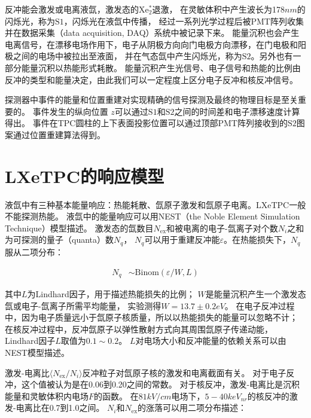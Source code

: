 反冲能会激发或电离液氙，激发态的$\mathrm{Xe_2^*}$退激，
在灵敏体积中产生波长为178$\si{nm}$的闪烁光，称为$\mathrm{S1}$，闪烁光在液氙中传播，
经过一系列光学过程后被PMT阵列收集并在数据采集（data acquisition, DAQ）系统中被记录下来。
能量沉积也会产生电离信号，在漂移电场作用下，电子从阴极方向向门电极方向漂移，在门电极和阳极之间的电场中被拉出至液面，
并在气态氙中产生闪烁光，称为$\mathrm{S2}$。另外也有一部分能量沉积以热能形式耗散。
能量沉积产生光信号、电子信号和热能的比例由反冲的类型和能量决定，由此我们可以一定程度上区分电子反冲和核反冲信号。

探测器中事件的能量和位置重建对实现精确的信号探测及最终的物理目标是至关重要的。
事件发生的纵向位置 $z$可以通过$\mathrm{S1}$和$\mathrm{S2}$之间的时间差和电子漂移速度计算得出。
事件在TPC圆柱的上下表面投影位置可以通过顶部PMT阵列接收到的$\mathrm{S2}$图案通过位置重建算法得到。

\section{LXeTPC的响应模型}
\label{sec:basic_response}

液氙中有三种基本能量响应：热能耗散、氙原子激发和氙原子电离。LXeTPC一般不能探测热能。
液氙中的能量响应可以用NEST（the Noble Element Simulation Technique）模型描述\cite{szydagis_nest_2011,lenardo_global_2015}。
激发态的氙数目$N_{\mathrm{ex}}$和被电离的电子-氙离子对个数$N_i$之和为可探测的量子（quanta）数$N_q$，
$N_q$可以用于重建反冲能$\varepsilon $。在热能损失下，$N_q$服从二项分布：

\begin{align}
    \label{eq:N_q}
    N_q &\sim \mathrm{Binom}\left(\varepsilon /W,L\right)
\end{align}

其中$L$为Lindhard因子，用于描述热能损失的比例；
$W$是能量沉积产生一个激发态氙或电子-氙离子所需平均能量，
实验测得$W=13.7\pm0.2\si{eV}$\cite{szydagis_nest_2011}。
在电子反冲过程中，因为电子质量远小于氙原子核质量，所以以热能损失的能量可以忽略不计；
在核反冲过程中，反冲氙原子以弹性散射方式向其周围氙原子传递动能，Lindhard因子$L$取值为$0.1\sim0.2$。
$L$对电场大小和反冲能量的依赖关系可以由NEST模型描述。

激发-电离比$\langle N_{\mathrm{ex}}/N_i\rangle$反冲粒子对氙原子核的激发和电离截面有关。
对于电子反冲，这个值被认为是在0.06到0.20之间的常数。
对于核反冲，激发-电离比是沉积能量和灵敏体积内电场$F$的函数\cite{lenardo_global_2015}。
在$81\si{kV/cm}$电场下，$5-40\si{keV_{nr}}$的核反冲的激发-电离比在0.7到1.0之间。
$N_i$和$N_{\mathrm{ex}}$的涨落可以用二项分布描述：

